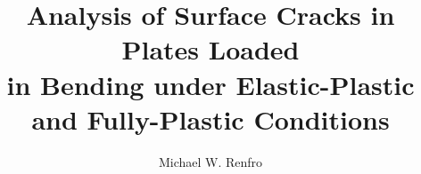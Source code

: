 \documentclass[twoside,10pt]{ttuthesis}
\author{Michael W. Renfro}
\title{Analysis of Surface Cracks in Plates Loaded \\
in Bending under Elastic-Plastic\\
and Fully-Plastic Conditions}
\begin{document}
\begin{Spacing}{1}
\tableofcontents*  %
\listoftables      %
\listoffigures     %
\renewcommand{\nomname}{LIST OF SYMBOLS}
\printnomenclature[0.5in] %
\end{Spacing}
\mainmatter








\appendix



\end{document}
